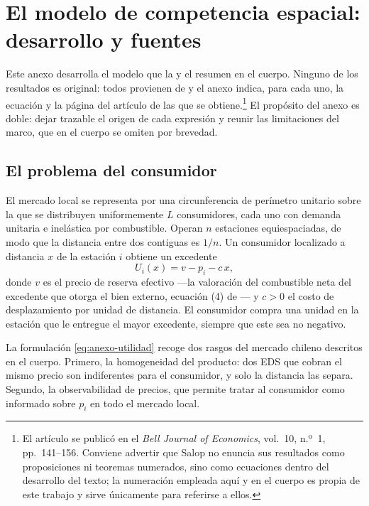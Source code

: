 \section{El modelo de competencia espacial: desarrollo y fuentes}
\label{anexo:modelo}

Este anexo desarrolla el modelo que la  y el
 resumen en el cuerpo. Ninguno de los resultados es original:
todos provienen de \textcite{SALOP1979} y el anexo indica, para cada uno, la
ecuación y la página del artículo de las que se obtiene.\footnote{El artículo se
publicó en el \emph{Bell Journal of Economics}, vol.~10, n.º~1, pp.~141--156.
Conviene advertir que Salop no enuncia sus resultados como proposiciones ni
teoremas numerados, sino como ecuaciones dentro del desarrollo del texto; la
numeración empleada aquí y en el cuerpo es propia de este trabajo y sirve
únicamente para referirse a ellos.} El propósito del anexo es doble: dejar
trazable el origen de cada expresión y reunir las limitaciones del marco, que en
el cuerpo se omiten por brevedad.

\subsection{El problema del consumidor}

El mercado local se representa por una circunferencia de perímetro unitario
sobre la que se distribuyen uniformemente $L$ consumidores, cada uno con demanda
unitaria e inelástica por combustible. Operan $n$ estaciones equiespaciadas, de
modo que la distancia entre dos contiguas es $1/n$. Un consumidor localizado a
distancia $x$ de la estación $i$ obtiene un excedente
\begin{equation}
    U_i(x) = v - p_i - c\,x ,
    \label{eq:anexo-utilidad}
\end{equation}
donde $v$ es el precio de reserva efectivo —la valoración del combustible neta
del excedente que otorga el bien externo, ecuación (4) de
\textcite[142]{SALOP1979}— y $c>0$ el costo de desplazamiento por unidad de
distancia. El consumidor compra una unidad en la estación que le entregue el
mayor excedente, siempre que este sea no negativo.

La formulación \eqref{eq:anexo-utilidad} recoge dos rasgos del mercado chileno
descritos en el cuerpo. Primero, la homogeneidad del producto: dos EDS que cobran
el mismo precio son indiferentes para el consumidor, y solo la distancia las
separa. Segundo, la observabilidad de precios, que permite tratar al consumidor
como informado sobre $p_i$ en todo el mercado local.

